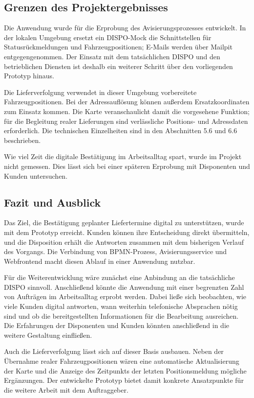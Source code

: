 \subsection{Grenzen des Projektergebnisses}

Die Anwendung wurde für die Erprobung des Avisierungsprozesses entwickelt. In der lokalen
Umgebung ersetzt ein DISPO-Mock die Schnittstellen für Statusrückmeldungen und
Fahrzeugpositionen; E-Mails werden über Mailpit entgegengenommen. Der Einsatz mit dem
tatsächlichen DISPO und den betrieblichen Diensten ist deshalb ein weiterer Schritt
über den vorliegenden Prototyp hinaus.

Die Lieferverfolgung verwendet in dieser Umgebung vorbereitete Fahrzeugpositionen. Bei der
Adressauflösung können außerdem Ersatzkoordinaten zum Einsatz kommen. Die Karte
veranschaulicht damit die vorgesehene Funktion; für die Begleitung realer Lieferungen sind
verlässliche Positions- und Adressdaten erforderlich. Die technischen Einzelheiten sind in
den Abschnitten 5.6 und 6.6 beschrieben.

Wie viel Zeit die digitale Bestätigung im Arbeitsalltag spart, wurde im Projekt nicht
gemessen. Dies lässt sich bei einer späteren Erprobung mit Disponenten und Kunden
untersuchen.

\subsection{Fazit und Ausblick}

Das Ziel, die Bestätigung geplanter Liefertermine digital zu unterstützen, wurde mit dem
Prototyp erreicht. Kunden können ihre Entscheidung direkt übermitteln, und die Disposition
erhält die Antworten zusammen mit dem bisherigen Verlauf des Vorgangs. Die Verbindung von
BPMN-Prozess, Avisierungsservice und Webfrontend macht diesen Ablauf in einer Anwendung
nutzbar.

Für die Weiterentwicklung wäre zunächst eine Anbindung an die tatsächliche DISPO
sinnvoll. Anschließend könnte die Anwendung mit einer begrenzten Zahl von Aufträgen im
Arbeitsalltag erprobt werden. Dabei ließe sich beobachten, wie viele Kunden digital
antworten, wann weiterhin telefonische Absprachen nötig sind und ob die bereitgestellten
Informationen für die Bearbeitung ausreichen. Die Erfahrungen der Disponenten und Kunden
könnten anschließend in die weitere Gestaltung einfließen.

Auch die Lieferverfolgung lässt sich auf dieser Basis ausbauen. Neben der Übernahme realer
Fahrzeugpositionen wären eine automatische Aktualisierung der Karte und die Anzeige des
Zeitpunkts der letzten Positionsmeldung mögliche Ergänzungen. Der entwickelte Prototyp
bietet damit konkrete Ansatzpunkte für die weitere Arbeit mit dem Auftraggeber.
